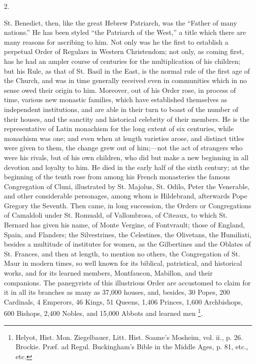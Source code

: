 2.

St. Benedict, then, like the great Hebrew Patriarch, was the
``Father of many nations.'' He has been styled ``the
Patriarch of the West,'' a title which there are many reasons for
ascribing to him. Not only was he the first to establish a perpetual
Order of Regulars in Western Christendom; not only, as coming
first, has he had an ampler course of centuries for the multiplication
of his children; but his Rule, as that of St. Basil in the East, is
the normal rule of the first age of the Church, and was in time
generally received even in communities which in no sense owed their
origin to him. Moreover, out of his Order rose, in process of time,
various new monastic families, which have established themselves as
independent institutions, and are able in their turn to boast of the
number of their houses, and the sanctity and historical celebrity of
their members. He is the representative of Latin monachism for the
long extent of six centuries, while monachism was one; and even when
at length varieties arose, and distinct titles were given to them, the
change grew out of him;—not the act of strangers who were his
rivals, but of his own children, who did but make a new beginning in
all devotion and loyalty to him. He died in the early half of the
sixth century; at the beginning of the tenth rose from among his
French monasteries the famous Congregation of Cluni, illustrated by
St. Majolus, St. Odilo, Peter the Venerable, and other considerable
personages, among whom is Hildebrand, afterwards Pope Gregory the
Seventh. Then came, in long succession, the Orders or Congregations of
Camaldoli under St. Romuald, of Vallombrosa, of Citeaux, to which St.
Bernard has given his name, of Monte Vergine, of Fontvrault; those of
England, Spain, and Flanders; the Silvestrines, the Celestines, the
Olivetans, the Humiliati, besides a multitude of institutes for women,
as the Gilbertines and the Oblates of St. Frances, and then at length,
to mention no others, the Congregation of St. Maur in modern times, so
well known for its biblical, patristical, and historical works, and
for its learned members, Montfaucon, Mabillon, and their
companions. The panegyrists of this illustrious Order are accustomed
to claim for it in all its branches as many as 37,000 houses, and,
besides, 30 Popes, 200 Cardinals, 4 Emperors, 46 Kings, 51 Queens,
1,406 Princes, 1,600 Archbishops, 600 Bishops, 2,400 Nobles, and 15,000
Abbots and learned men \footnote{Helyot, Hist.
Mon. Ziegelbauer, Litt. Hist. Soame's Mosheim, vol. ii., p. 26.
Brockie. Præf. ad Regul. Buckingham's Bible in the Middle Ages, p.
81, etc., etc.}.

